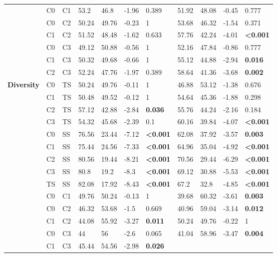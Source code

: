 \begin{table}[htp]
\begin{tabular}{l l l l l l l l l l l}
\\
 & C0 & C1 & 53.2 & 46.8 & -1.96 & 0.389
& 51.92 & 48.08 & -0.45 & 0.777
\\
 & C0 & C2 & 50.24 & 49.76 & -0.23 & 1
& 53.68 & 46.32 & -1.54 & 0.371
\\
 & C1 & C2 & 51.52 & 48.48 & -1.62 & 0.633
& 57.76 & 42.24 & -4.01 & \textbf{\textless0.001}
\\
 & C0 & C3 & 49.12 & 50.88 & -0.56 & 1
& 52.16 & 47.84 & -0.86 & 0.777
\\
 & C1 & C3 & 50.32 & 49.68 & -0.66 & 1
& 55.12 & 44.88 & -2.94 &\textbf{0.016}
\\
 & C2 & C3 & 52.24 & 47.76 & -1.97 & 0.389
& 58.64 & 41.36 & -3.68 & \textbf{0.002}
\\
 \hline
\multirow{15}{*}{\textbf{Diversity}} & C0 & TS & 50.24 & 49.76 & -0.11 & 1
& 46.88 & 53.12 & -1.38 & 0.676
\\
 & C1 & TS & 50.48 & 49.52 & -0.12 & 1
& 54.64 & 45.36 & -1.88 & 0.298
\\
 & C2 & TS & 57.12 & 42.88 & -2.84 & \textbf{0.036}
& 55.76 & 44.24 & -2.16 & 0.184
\\
 & C3 & TS & 54.32 & 45.68 & -2.39 & 0.1
& 60.16 & 39.84 & -4.07 & \textbf{\textless0.001}
\\
 & C0 & SS & 76.56 & 23.44 & -7.12 & \textbf{\textless0.001}
& 62.08 & 37.92 & -3.57 & \textbf{0.003}
\\
 & C1 & SS & 75.44 & 24.56 & -7.33 & \textbf{\textless0.001}
& 64.96 & 35.04 & -4.92 & \textbf{\textless0.001}
\\
 & C2 & SS & 80.56 & 19.44 & -8.21 & \textbf{\textless0.001}
& 70.56 & 29.44 & -6.29 & \textbf{\textless0.001}
\\
 & C3 & SS & 80.8 & 19.2 & -8.3 & \textbf{\textless0.001}
& 69.12 & 30.88 & -5.53 & \textbf{\textless0.001}
\\
 & TS & SS & 82.08 & 17.92 & -8.43 & \textbf{\textless0.001}
& 67.2 & 32.8 & -4.85 & \textbf{\textless0.001}
\\
 & C0 & C1 & 49.76 & 50.24 & -0.13 & 1
& 39.68 & 60.32 & -3.61 &\textbf{0.003}
\\
 & C0 & C2 & 46.32 & 53.68 & -1.5 & 0.669
& 40.96 & 59.04 & -3.14 & \textbf{0.012}
\\
 & C1 & C2 & 44.08 & 55.92 & -3.27 & \textbf{0.011}
& 50.24 & 49.76 & -0.22 & 1
\\
 & C0 & C3 & 44 & 56 & -2.6 & 0.065
& 41.04 & 58.96 & -3.47 & \textbf{0.004}
\\
 & C1 & C3 & 45.44 & 54.56 & -2.98 & \textbf{0.026}

\end{tabular}
\end{table}
